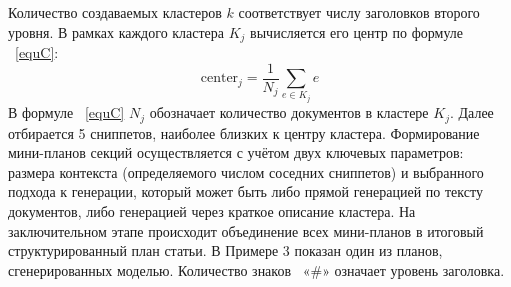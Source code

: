 \documentclass{article}
\theoremstyle{definition}
\theoremstyle{plain}
\begin{document}
Количество создаваемых кластеров $k$ соответствует числу заголовков второго уровня. 
В рамках каждого кластера $K_j$ вычисляется его центр по формуле ~\eqref{equC}:
\begin{equation}\label{equC}
\text{center}_j = \frac{1}{N_j} \sum_{e \in K_j} e
\end{equation}
В формуле ~\eqref{equC} $N_j$ обозначает количество документов в кластере $K_j$.
Далее отбирается 5 сниппетов, наиболее близких к центру кластера.  Формирование мини-планов секций осуществляется с учётом двух ключевых параметров: размера контекста (определяемого числом соседних сниппетов) и выбранного подхода к генерации, который может быть либо прямой генерацией по тексту документов, либо генерацией через краткое описание кластера. 
На заключительном этапе происходит объединение всех мини-планов в итоговый структурированный план статьи.
В Примере 3 показан один из планов, сгенерированных моделью. Количество знаков ~«\#» означает уровень заголовка.
\end{document}

